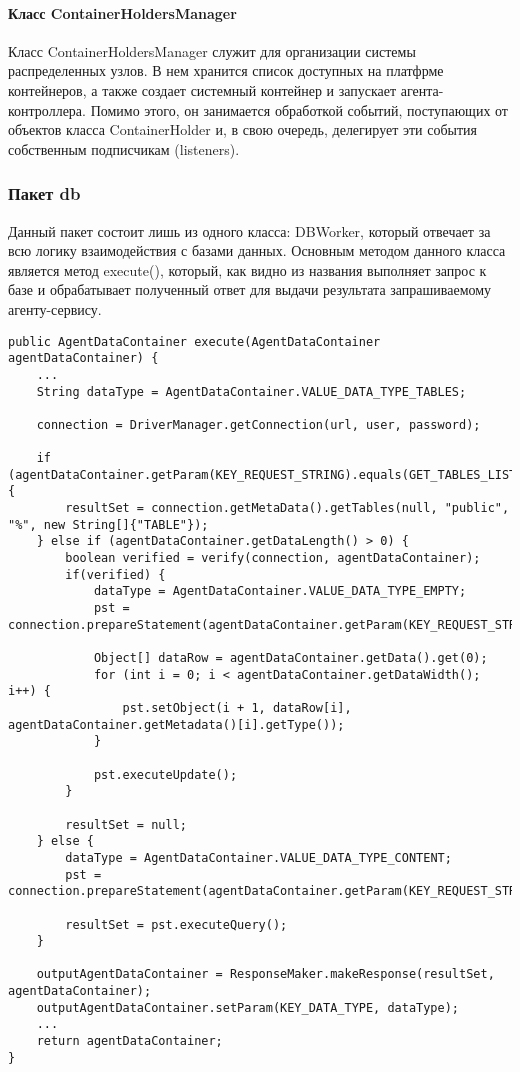 \paragraph{Класс ContainerHoldersManager}
Класс ContainerHoldersManager служит для организации системы распределенных узлов. В нем хранится список доступных на платфрме контейнеров, а также создает системный контейнер и запускает агента-контроллера. Помимо этого, он занимается обработкой событий, поступающих от объектов класса ContainerHolder и, в свою очередь, делегирует эти события собственным подписчикам (listeners).

\subsubsection{Пакет db}
Данный пакет состоит лишь из одного класса: DBWorker, который отвечает за всю логику взаимодействия с базами данных. Основным методом данного класса является метод execute(), который, как видно из названия выполняет запрос к базе и обрабатывает полученный ответ для выдачи результата запрашиваемому агенту-сервису.
\begin{lstlisting}
public AgentDataContainer execute(AgentDataContainer agentDataContainer) {
    ...
    String dataType = AgentDataContainer.VALUE_DATA_TYPE_TABLES;

    connection = DriverManager.getConnection(url, user, password);

    if (agentDataContainer.getParam(KEY_REQUEST_STRING).equals(GET_TABLES_LIST)) {
        resultSet = connection.getMetaData().getTables(null, "public", "%", new String[]{"TABLE"});
    } else if (agentDataContainer.getDataLength() > 0) {
        boolean verified = verify(connection, agentDataContainer);
        if(verified) {
            dataType = AgentDataContainer.VALUE_DATA_TYPE_EMPTY;
            pst = connection.prepareStatement(agentDataContainer.getParam(KEY_REQUEST_STRING));

            Object[] dataRow = agentDataContainer.getData().get(0);
            for (int i = 0; i < agentDataContainer.getDataWidth(); i++) {
                pst.setObject(i + 1, dataRow[i], agentDataContainer.getMetadata()[i].getType());
            }

            pst.executeUpdate();
        }

        resultSet = null;
    } else {
        dataType = AgentDataContainer.VALUE_DATA_TYPE_CONTENT;
        pst = connection.prepareStatement(agentDataContainer.getParam(KEY_REQUEST_STRING));

        resultSet = pst.executeQuery();
    }

    outputAgentDataContainer = ResponseMaker.makeResponse(resultSet, agentDataContainer);
    outputAgentDataContainer.setParam(KEY_DATA_TYPE, dataType);
    ...
    return agentDataContainer;
}
\end{lstlisting}
